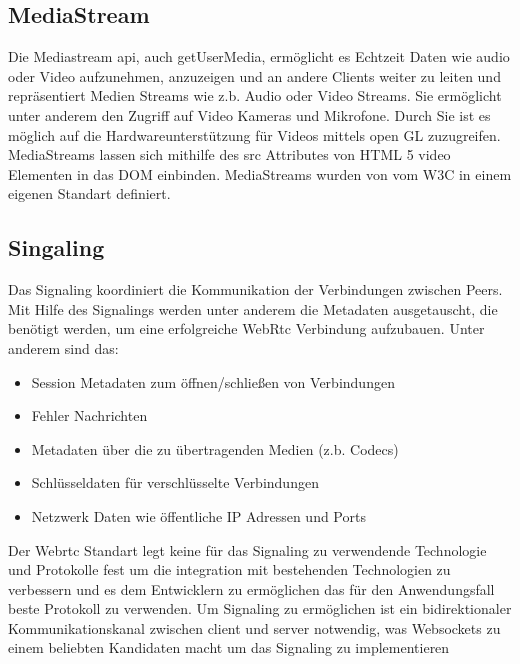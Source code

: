 \subsection{MediaStream}
Die Mediastream api, auch getUserMedia, ermöglicht es Echtzeit Daten wie audio oder Video aufzunehmen, anzuzeigen und an andere Clients weiter zu leiten und repräsentiert Medien Streams wie z.b. Audio oder Video Streams. Sie ermöglicht unter anderem den Zugriff auf Video Kameras und Mikrofone. Durch Sie ist es möglich auf die Hardwareunterstützung für Videos mittels open GL zuzugreifen. MediaStreams lassen sich mithilfe des src Attributes von HTML 5 video Elementen in das DOM einbinden. MediaStreams wurden von vom W3C in einem eigenen Standart definiert.\cite{w3MediaStream} 

\subsection{Singaling}
Das Signaling koordiniert die Kommunikation der Verbindungen zwischen Peers. Mit Hilfe des Signalings werden unter anderem die Metadaten ausgetauscht, die benötigt werden, um eine erfolgreiche WebRtc Verbindung aufzubauen. Unter anderem sind das:
\begin{itemize}
	\item Session Metadaten zum öffnen/schließen von Verbindungen
	\item Fehler Nachrichten
	\item Metadaten über die zu übertragenden Medien (z.b. Codecs)
	\item Schlüsseldaten für verschlüsselte Verbindungen
	\item Netzwerk Daten wie öffentliche IP Adressen und Ports
\end{itemize} 

Der Webrtc Standart legt keine für das Signaling zu verwendende Technologie und Protokolle fest um die integration mit bestehenden Technologien zu verbessern und es dem Entwicklern zu ermöglichen das für den Anwendungsfall beste Protokoll zu verwenden. Um Signaling zu ermöglichen ist ein bidirektionaler Kommunikationskanal zwischen client und server notwendig, was Websockets zu einem beliebten Kandidaten macht um das Signaling zu implementieren



